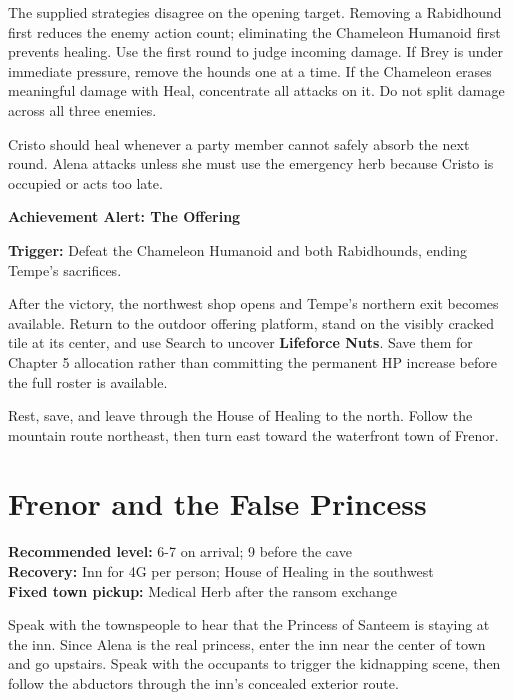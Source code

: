 \documentclass[
  american,
  10pt,
  letterpaper,
  oneside,
  open=any]{scrreprt}
\begin{document}
The supplied strategies disagree on the opening target. Removing a
Rabidhound first reduces the enemy action count; eliminating the
Chameleon Humanoid first prevents healing. Use the first round to judge
incoming damage. If Brey is under immediate pressure, remove the hounds
one at a time. If the Chameleon erases meaningful damage with Heal,
concentrate all attacks on it. Do not split damage across all three
enemies.

Cristo should heal whenever a party member cannot safely absorb the next
round. Alena attacks unless she must use the emergency herb because
Cristo is occupied or acts too late.

\begin{achievementalert}

\textbf{Achievement Alert: The Offering}

\textbf{Trigger:} Defeat the Chameleon Humanoid and both Rabidhounds,
ending Tempe's sacrifices.

\end{achievementalert}

After the victory, the northwest shop opens and Tempe's northern exit
becomes available. Return to the outdoor offering platform, stand on the
visibly cracked tile at its center, and use Search to uncover
\textbf{Lifeforce Nuts}. Save them for Chapter 5 allocation rather than
committing the permanent HP increase before the full roster is
available.

Rest, save, and leave through the House of Healing to the north. Follow
the mountain route northeast, then turn east toward the waterfront town
of Frenor.

\section{Frenor and the False
Princess}\label{frenor-and-the-false-princess}

\textbf{Recommended level:} 6-7 on arrival; 9 before the cave\\
\textbf{Recovery:} Inn for 4G per person; House of Healing in the
southwest\\
\textbf{Fixed town pickup:} Medical Herb after the ransom exchange

Speak with the townspeople to hear that the Princess of Santeem is
staying at the inn. Since Alena is the real princess, enter the inn near
the center of town and go upstairs. Speak with the occupants to trigger
the kidnapping scene, then follow the abductors through the inn's
concealed exterior route.
\end{document}
